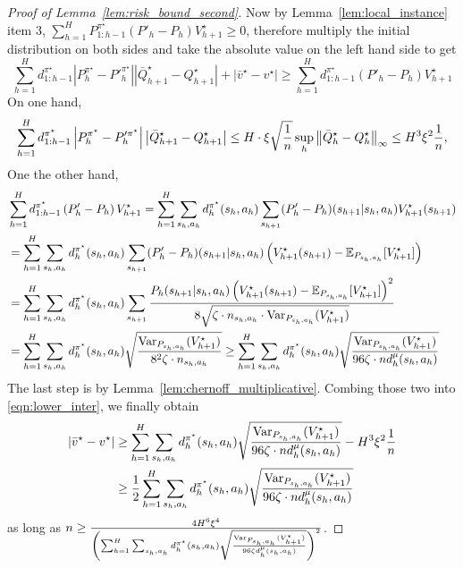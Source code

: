 \begin{proof}[Proof of Lemma~\ref{lem:risk_bound_second}]
Now by Lemma~\ref{lem:local_instance} item 3, $\sum_{h=1}^HP^{{\pi}^\star}_{1:h-1}\left(P'_h-P_h\right){V}_{h+1}^\star\geq 0$, therefore multiply the initial distribution on both sides and take the absolute value on the left hand side to get 
\begin{equation}\label{eqn:lower_inter}
\sum_{h=1}^H d^{{\pi}^\star}_{1:h-1}\left|P^{{\pi}^\star}_h-P'^{{\pi}^\star}_h\right|\left|\bar{Q}_{h+1}^\star-{Q}_{h+1}^\star\right|+|\bar{v}^\star-v^\star|\geq \sum_{h=1}^Hd^{{\pi}^\star}_{1:h-1}\left(P'_h-P_h\right){V}_{h+1}^\star
\end{equation}
On one hand, 
\[
\sum_{h=1}^H d^{{\pi}^\star}_{1:h-1}\left|P^{{\pi}^\star}_h-P'^{{\pi}^\star}_h\right|\left|\bar{Q}_{h+1}^\star-{Q}_{h+1}^\star\right|\leq H\cdot \xi\sqrt{\frac{1}{n}} \sup_h\left\lVert\bar{Q}^\star_h-Q^\star_h\right\rVert_\infty\leq H^3\xi^2\frac{1}{n},
\]
One the other hand, 
\begin{align*}
&\sum_{h=1}^Hd^{{\pi}^\star}_{1:h-1}\left(P'_h-P_h\right){V}_{h+1}^\star=\sum_{h=1}^H \sum_{s_h,a_h}d^{\pi^\star}_h(s_h,a_h)\sum_{s_{h+1}}(P'_h-P_h)(s_{h+1}|s_h,a_h)V^\star_{h+1}(s_{h+1})\\
&=\sum_{h=1}^H \sum_{s_h,a_h}d^{\pi^\star}_h(s_h,a_h)\sum_{s_{h+1}}(P'_h-P_h)(s_{h+1}|s_h,a_h)\left(V_{h+1}^\star(s_{h+1})-\mathbb{E}_{P_{s_h,a_h}}[V_{h+1}^\star]\right)\\
&=\sum_{h=1}^H \sum_{s_h,a_h}d^{\pi^\star}_h(s_h,a_h)\sum_{s_{h+1}}\frac{P_h(s_{h+1}|s_h,a_h)\left(V_{h+1}^\star(s_{h+1})-\mathbb{E}_{P_{s_h,a_h}}[V_{h+1}^\star]\right)^2}{8\sqrt{\zeta\cdot n_{s_h,a_h}\cdot \mathrm{Var}_{P_{s_h,a_h}}(V_{h+1}^\star)}}\\
&=\sum_{h=1}^H \sum_{s_h,a_h}d^{\pi^\star}_h(s_h,a_h)\sqrt{\frac{\mathrm{Var}_{P_{s_h,a_h}}(V_{h+1}^\star)}{8^2\zeta\cdot n_{s_h,a_h}}}\geq \sum_{h=1}^H \sum_{s_h,a_h}d^{\pi^\star}_h(s_h,a_h)\sqrt{\frac{\mathrm{Var}_{P_{s_h,a_h}}(V_{h+1}^\star)}{96 \zeta\cdot n d^\mu_h(s_h,a_h)}}\\
\end{align*}
The last step is by Lemma~\ref{lem:chernoff_multiplicative}. Combing those two into \eqref{eqn:lower_inter}, we finally obtain
\begin{equation}\label{eqn:lower_final}
\begin{aligned}
|\bar{v}^\star-v^\star|&\geq \sum_{h=1}^H \sum_{s_h,a_h}d^{\pi^\star}_h(s_h,a_h)\sqrt{\frac{\mathrm{Var}_{P_{s_h,a_h}}(V_{h+1}^\star)}{96\zeta\cdot n d^\mu_h(s_h,a_h)}}-H^3\xi^2\frac{1}{n}\\
&\geq \frac{1}{2}\sum_{h=1}^H \sum_{s_h,a_h}d^{\pi^\star}_h(s_h,a_h)\sqrt{\frac{\mathrm{Var}_{P_{s_h,a_h}}(V_{h+1}^\star)}{96\zeta\cdot n d^\mu_h(s_h,a_h)}}
\end{aligned}
\end{equation}
as long as $n\geq \frac{4H^6\xi^4}{\left(\sum_{h=1}^H \sum_{s_h,a_h}d^{\pi^\star}_h(s_h,a_h)\sqrt{\frac{\mathrm{Var}_{P_{s_h,a_h}}(V_{h+1}^\star)}{96\zeta d^\mu_h(s_h,a_h)}}\right)^2}$.


\end{proof}
